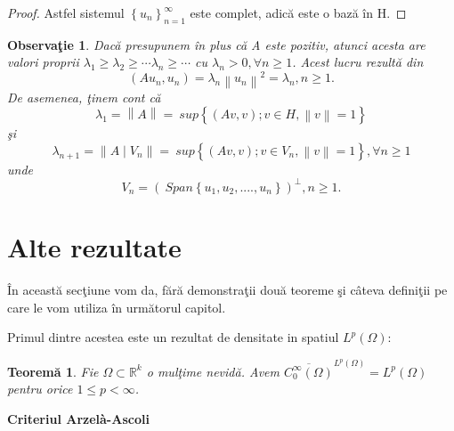 \documentclass[a4paper,12pt,oneside]{report}
\newtheorem{theorem}{Teorem\u a}
\newtheorem{remark}{Observa\c{t}ie}
\begin{document}
\begin{proof}
Astfel sistemul \(\left \{ u_{n} \right \}_{n=1}^{\infty }\) este complet, adic\u{a} este o baz\u{a} \^{i}n H.
\end{proof}
\begin{remark}
Dac\u{a} presupunem \^{i}n plus c\u{a} A este pozitiv, atunci acesta are valori proprii \(\lambda _{1} \geq \lambda _{2} \geq \cdots \lambda _{n }\geq \cdots\) cu \(\lambda _{n }> 0 , \forall n \geq 1\). Acest lucru rezult\u{a} din
\begin{displaymath}
  \left ( Au_{n},u_{n} \right ) = \lambda _{n} \left \| u_{n} \right \|^{2} = \lambda _{n}, n\geq 1.
\end{displaymath}
De asemenea, \c{t}inem cont c\u{a}
\begin{displaymath}
  \lambda _{1} = \left \| A \right \| = \ sup \left \{ \left ( Av,v \right ); v\in H, \left \| v \right \| = 1\right \}
\end{displaymath}
\c{s}i
\begin{displaymath}
  \lambda _{n+1} = \left \| A\mid V_{n} \right \| = \ sup \left \{ \left ( Av,v \right ); v\in V_{n}, \left \| v \right \| = 1\right \}, \forall n \geq 1
\end{displaymath}
unde
\begin{displaymath}
  V_{n} = \left ( \ Span \left \{ u_{1},u_{2},....,u_{n} \right \} \right )^{\perp }, n\geq 1.
\end{displaymath}
\end{remark}

\section{Alte rezultate}

\^{I}n aceast\u{a} sec\c{t}iune vom da, f\u{a}r\u{a} demonstra\c{t}ii dou\u{a} teoreme \c{s}i c\^{a}teva defini\c{t}ii pe care le vom utiliza \^{i}n urm\u{a}torul capitol.

Primul dintre acestea este un rezultat de densitate in spatiul $L^{p}\left ( \Omega  \right ):$

\begin{theorem}
Fie \(\Omega \subset \mathbb{R}^{k}\) o mul\c{t}ime nevid\u{a}. Avem \(\overline{C_{0}^{\infty }\left ( \Omega  \right )}^{L^{p}\left ( \Omega  \right )} = L^{p}\left ( \Omega  \right )\)  pentru orice \(1\leq p< \infty \).
\end{theorem}

\textbf{Criteriul Arzelà-Ascoli}
\end{document}
